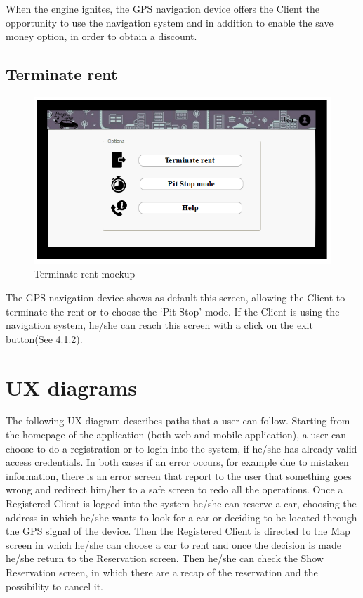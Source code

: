 When the engine ignites, the GPS navigation device offers the Client the opportunity to use the navigation system and in addition to enable the save money option, in order to obtain a discount.

\subsection{Terminate rent}
\begin{figure}[H]
\centering
\includegraphics[scale=0.65, keepaspectratio]{../images/mockups/terminate_rent.png}
\caption{Terminate rent mockup}
\end{figure}

The GPS navigation device shows as default this screen, allowing the Client to terminate the rent or to choose the ‘Pit Stop’ mode.
If the Client is using the navigation system, he/she can reach this screen with a click on the exit button(See 4.1.2).

\section{UX diagrams}
The following UX diagram describes paths that a user can follow.
Starting from the homepage of the application (both web and mobile application), a user can choose to do a registration or to login into the system, if he/she has already valid access credentials.
In both cases if an error occurs, for example due to mistaken information, there is an error screen that report to the user that something goes wrong and redirect him/her to a safe screen to redo all the operations.
Once a Registered Client is logged into the system he/she can reserve a car, choosing the address in which he/she wants to look for a car or deciding to be located through the GPS signal of the device.
Then the Registered Client is directed to the Map screen in which he/she can choose a car to rent and once the decision is made he/she return to the Reservation screen.
Then he/she can check the Show Reservation screen, in which there are a recap of the reservation and the possibility to cancel it.

